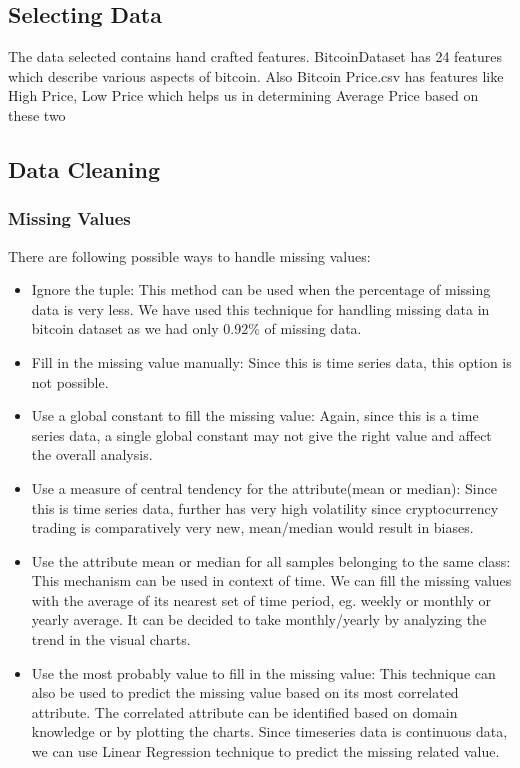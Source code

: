 \documentclass{article}
\begin{document}
\subsection{Selecting Data}

The data selected contains hand crafted features. Bitcoin\textunderscore Dataset has 24 features which describe various aspects of bitcoin. Also Bitcoin Price.csv has features like High Price, Low Price which helps us in determining Average Price based on these two 

\subsection{Data Cleaning}
\subsubsection{Missing Values}

There are following possible ways to handle missing values:
\begin{itemize}
    \item 
    Ignore the tuple: This method can be used when the percentage of missing data is very less. We have used this technique for handling missing data in bitcoin dataset as we had only 0.92\% of missing data.
    \item
    Fill in the missing value manually: Since this is time series data, this option is not possible.
    
    \item
    Use a global constant to fill the missing value: Again, since this is a time series data, a single global constant may not give the right value and affect the overall analysis.
    
    \item
    Use a measure of central tendency for the attribute(mean or median): Since this is time series data, further has very high volatility since cryptocurrency trading is comparatively very new, mean/median would result in biases.
    
    \item
    Use the attribute mean or median for all samples belonging to the same class: This mechanism can be used in context of time. We can fill the missing values with the average of its nearest set of time period, eg. weekly or monthly or yearly average. It can be decided to take monthly/yearly by analyzing the trend in the visual charts.
    
    \item
    Use the most probably value to fill in the missing value: This technique can also be used to predict the missing value based on its most correlated attribute. The correlated attribute can be identified based on domain knowledge or by plotting the charts. Since time\textunderscore series data is continuous data, we can use Linear Regression technique to predict the missing related value.
\end{itemize}
\end{document}
